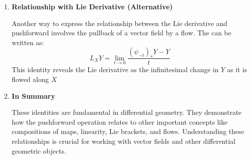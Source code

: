 \documentclass[10pt,a4paper]{report}
\begin{document}
\begin{remark}
\begin{enumerate}
 	\item  \textbf{Relationship with Lie Derivative (Alternative)}

	Another way to express the relationship between the Lie derivative and pushforward involves the pullback of a vector field by a flow. The  can be written as: 
 	\[L_{X}Y=\lim _{t\rightarrow 0}\frac{(\psi _{-t})_{*}Y-Y}{t}\] This identity reveals the Lie derivative as the infinitesimal change in \(Y\) as it is flowed along \(X\)

	\item\textbf{In Summary}
	
	These identities are fundamental in differential geometry. They demonstrate how the pushforward operation relates to other important concepts like compositions of maps, linearity, Lie brackets, and flows. Understanding these relationships is crucial for working with vector fields and other differential geometric objects. 
	 	
 	 \end{enumerate}
 \end{remark}
\end{document}
